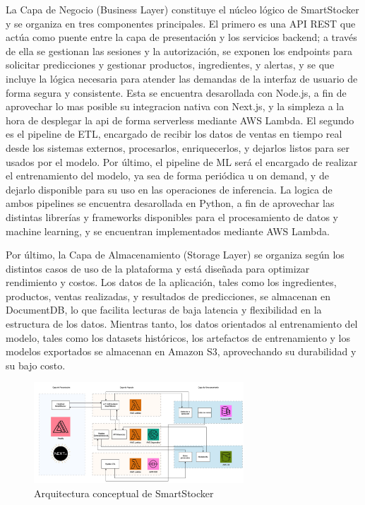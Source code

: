 La Capa de Negocio (Business Layer) constituye el núcleo lógico de SmartStocker y se organiza en tres componentes principales. El primero es una API REST que actúa como puente entre la capa de presentación y los servicios backend; a través de ella se gestionan las sesiones y la autorización, se exponen los endpoints para solicitar predicciones y gestionar productos, ingredientes, y alertas, y se que incluye la lógica necesaria para atender las demandas de la interfaz de usuario de forma segura y consistente. Esta se encuentra desarollada con Node.js, a fin de aprovechar lo mas posible su integracion nativa con Next.js, y la simpleza a la hora de desplegar la api de forma serverless mediante AWS Lambda. El segundo es el pipeline de ETL, encargado de recibir los datos de ventas en tiempo real desde los sistemas externos, procesarlos, enriquecerlos, y dejarlos listos para ser usados por el modelo. Por último, el pipeline de ML será el encargado de realizar el entrenamiento del modelo, ya sea de forma periódica u on demand, y de dejarlo disponible para su uso en las operaciones de inferencia. La logica de ambos pipelines se encuentra desarollada en Python, a fin de aprovechar las distintas librerías y frameworks disponibles para el procesamiento de datos y machine learning, y se encuentran implementados mediante AWS Lambda.

Por último, la Capa de Almacenamiento (Storage Layer) se organiza según los distintos casos de uso de la plataforma y está diseñada para optimizar rendimiento y costos. Los datos de la aplicación, tales como los ingredientes, productos, ventas realizadas,  y resultados de predicciones, se almacenan en DocumentDB, lo que facilita lecturas de baja latencia y flexibilidad en la estructura de los datos. Mientras tanto, los datos orientados al entrenamiento del modelo, tales como los datasets históricos, los artefactos de entrenamiento y los modelos exportados se almacenan en Amazon S3, aprovechando su durabilidad y su bajo costo.

\begin{figure}[htbp]
    \centering
    \includegraphics[width=0.7\textwidth]{images/arquitectura_capas.png}
    \caption{Arquitectura conceptual de SmartStocker}
    \label{fig:arquitectura-conceptual}
\end{figure}

